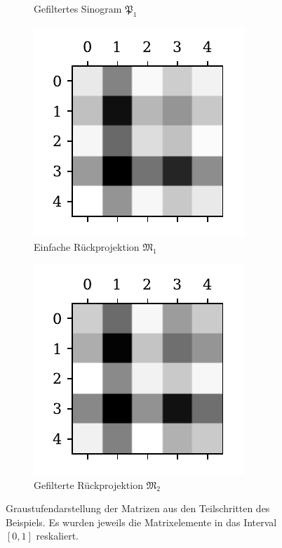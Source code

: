 \documentclass[slug=PET, room=Andreas-Schubert-Bau\,\ 424A, supervisor=Carsten\ Bittrich, coursedate=10.\ 01.\ 2020]{../../Lab_Report_LaTeX/lab_report}
\begin{document}
\begin{figure}[htp]
\begin{subfigure}[t]{.25\textwidth}
    \caption{Gefiltertes Sinogram \(\mathfrak{P}_1\)}
    \label{fig:theory-convoluted}
  \end{subfigure}
  \begin{subfigure}[t]{.25\textwidth}
    \centering
    \includegraphics[width=.6\textwidth]{../auswertung/figs/theory/rec_simple.pdf}
    \caption{Einfache R\"uckprojektion \(\mathfrak{M}_1\)}
    \label{fig:theory-rec_simple}
  \end{subfigure}
  \begin{subfigure}[t]{.25\textwidth}
    \centering
    \includegraphics[width=.6\textwidth]{../auswertung/figs/theory/rec_filtered.pdf}
    \caption{Gefilterte R\"uckprojektion \(\mathfrak{M}_2\)}
    \label{fig:theory-rec_filtered}
  \end{subfigure}
  \caption[Graustufendarstellung der
  Beispielmatrizen]{Graustufendarstellung der Matrizen aus den
    Teilschritten des Beispiels. Es wurden jeweils die Matrixelemente
    in das Interval \([0,1]\) reskaliert.}
  \label{fig:graubei}
\end{figure}
\end{document}
